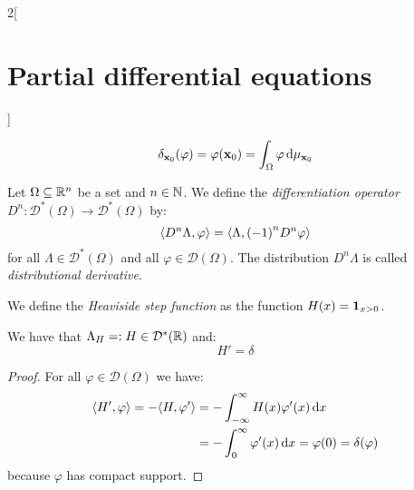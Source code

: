 \documentclass[../../../main_math.tex]{subfiles}
\begin{document}
\begin{multicols}{2}[\section{Partial differential equations}]
\begin{lemma}
    $$\delta_{\boldsymbol{\mathrm{x}}_0}(\varphi)=\varphi(\boldsymbol{\mathrm{x}}_0)=\int_\Omega\varphi\dd{\mu_{\boldsymbol{\mathrm{x}}_0}}$$
  \end{lemma}
  \begin{definition}
    Let $\Omega\subseteq \mathbb{R}^n$ be a set and $n\in\mathbb{N}$. We define the \emph{differentiation operator} $D^n:\mathcal{D}^*(\Omega)\rightarrow\mathcal{D}^*(\Omega)$ by: $${\left\langle D^n\Lambda,\varphi\right\rangle}={\left\langle\Lambda,{(-1)}^nD^n\varphi\right\rangle}$$
    for all $\Lambda\in\mathcal{D}^*(\Omega)$ and all $\varphi\in\mathcal{D}(\Omega)$. The distribution $D^n\Lambda$ is called \emph{distributional derivative}.
  \end{definition}
  \begin{definition}
    We define the \emph{Heaviside step function} as the function $H(x)=\boldsymbol{\mathrm{1}}_{x>0}$.
  \end{definition}
  \begin{proposition}
    We have that $\Lambda_{H}=:H\in\mathcal{D}^*(\mathbb{R})$ and: $$H'=\delta$$
  \end{proposition}
  \begin{proof}
    For all $\varphi\in\mathcal{D}(\Omega)$ we have:
    \begin{align*}
      {\left\langle H',\varphi\right\rangle}=-{\left\langle H,\varphi'\right\rangle} & =-\int_{-\infty}^\infty H(x)\varphi'(x)\dd{x}                  \\
                                             & =-\int_{0}^\infty\varphi'(x)\dd{x}= \varphi(0)=\delta(\varphi)
    \end{align*}
    because $\varphi$ has compact support.
  \end{proof}

\end{multicols}
\end{document}
